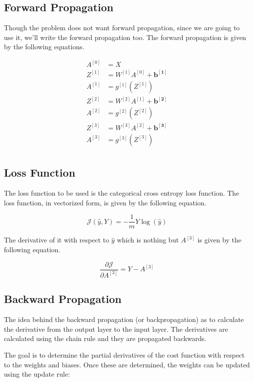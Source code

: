 \documentclass[12pt]{article}
\begin{document}
\subsection{Forward Propagation}
Though the problem does not want forward propagation, since we are going to use it, we'll write the forward propagation too. The forward propagation is given by the following equations.

$$
    \begin{aligned}
        A^{[0]} & = X                                  \\
        Z^{[1]} & = W^{[1]} A^{[0]} + \mathbf{b^{[1]}} \\
        A^{[1]} & = g^{[1]}(Z^{[1]})                   \\
        Z^{[2]} & = W^{[2]} A^{[1]} + \mathbf{b^{[2]}} \\
        A^{[2]} & = g^{[2]}(Z^{[2]})                   \\
        Z^{[3]} & = W^{[3]} A^{[2]} + \mathbf{b^{[3]}} \\
        A^{[3]} & = g^{[3]}(Z^{[3]})                   \\
    \end{aligned}
$$

\subsection{Loss Function}
The loss function to be used is the categorical cross entropy loss function. The loss function, in vectorized form, is given by the following equation.

$$
    \mathcal{J}(\hat{y}, Y) = -\frac{1}{m} Y \log(\hat{y})
$$

The derivative of it with respect to \(\hat{y}\) which is nothing but \(A^{[3]}\) is given by the following equation.

$$
    \frac{\partial{\mathcal{J}}}{\partial A^{[3]}} = Y - A^{[3]}
$$

\subsection{Backward Propagation}
The idea behind the backward propagation (or backpropagation) as to calculate the derivative from the output layer to the input layer. The derivatives are calculated using the chain rule and they are propagated backwards.

The goal is to determine the partial derivatives of the cost function with respect to the weights and biases. Once these are determined, the weights can be updated using the update rule:
\end{document}
